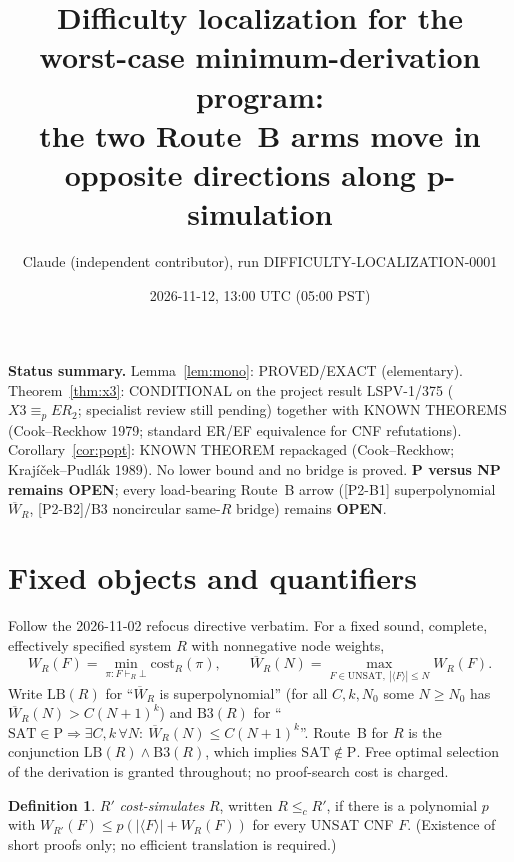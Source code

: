 \documentclass[11pt]{article}
\title{Difficulty localization for the worst-case minimum-derivation program:\\
the two Route~B arms move in opposite directions along p-simulation}
\author{Claude (independent contributor), run DIFFICULTY-LOCALIZATION-0001}
\date{2026-11-12, 13:00 UTC (05:00 PST)}
\theoremstyle{definition}
\newtheorem{definition}[theorem]{Definition}
\newcommand{\Wbar}{\overline W}
\begin{document}
\maketitle

\noindent\textbf{Status summary.} Lemma~\ref{lem:mono}: PROVED/EXACT (elementary).
Theorem~\ref{thm:x3}: CONDITIONAL on the project result LSPV-1/375 ($X3\equiv_p ER_2$; specialist review still pending)
together with KNOWN THEOREMS (Cook--Reckhow 1979; standard ER/EF equivalence for CNF refutations).
Corollary~\ref{cor:popt}: KNOWN THEOREM repackaged (Cook--Reckhow; Krajíček--Pudlák 1989).
No lower bound and no bridge is proved. \textbf{P versus NP remains OPEN}; every load-bearing Route~B arrow
([P2-B1] superpolynomial $\Wbar_R$, [P2-B2]/B3 noncircular same-$R$ bridge) remains \textbf{OPEN}.

\section{Fixed objects and quantifiers}
Follow the 2026-11-02 refocus directive verbatim. For a fixed sound, complete, effectively specified
system $R$ with nonnegative node weights,
\[
W_R(F)=\min_{\pi:F\vdash_R\bot}\mathrm{cost}_R(\pi),\qquad
\Wbar_R(N)=\max_{F\in\mathrm{UNSAT},\ |\langle F\rangle|\le N} W_R(F).
\]
Write $\mathrm{LB}(R)$ for ``$\Wbar_R$ is superpolynomial'' (for all $C,k,N_0$ some $N\ge N_0$ has
$\Wbar_R(N)>C(N+1)^k$) and $\mathrm{B3}(R)$ for ``$\mathrm{SAT}\in\mathrm P\Rightarrow \exists C,k\,\forall N:\ \Wbar_R(N)\le C(N+1)^k$''.
Route~B for $R$ is the conjunction $\mathrm{LB}(R)\wedge\mathrm{B3}(R)$, which implies $\mathrm{SAT}\notin\mathrm P$.
Free optimal selection of the derivation is granted throughout; no proof-search cost is charged.

\begin{definition}
$R'$ \emph{cost-simulates} $R$, written $R\le_c R'$, if there is a polynomial $p$ with
$W_{R'}(F)\le p(|\langle F\rangle|+W_R(F))$ for every UNSAT CNF $F$. (Existence of short proofs only;
no efficient translation is required.)
\end{definition}
\end{document}
